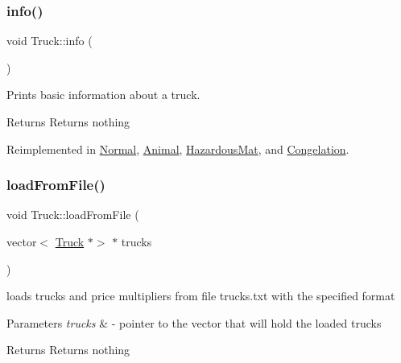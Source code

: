 \mbox{\label{class_truck_a38f09eab2822524e355ecf6d0a13f7de}} 
\subsubsection{\texorpdfstring{info()}{info()}}
{\footnotesize\ttfamily void Truck\+::info (\begin{DoxyParamCaption}{ }\end{DoxyParamCaption})\hspace{0.3cm}{\ttfamily [virtual]}}



Prints basic information about a truck. 

\begin{DoxyReturn}{Returns}
Returns nothing 
\end{DoxyReturn}


Reimplemented in \hyperlink{class_normal_ade6add2ee09e701113534c97e2a03307}{Normal}, \hyperlink{class_animal_a1e99083943239209f4fbe79380ea5991}{Animal}, \hyperlink{class_hazardous_mat_ab07463da3e9a5d3b8933d2b01332ed00}{Hazardous\+Mat}, and \hyperlink{class_congelation_ac2f7cb9aeeeb9428a9a973e6a2c63942}{Congelation}.

\mbox{\label{class_truck_ae2d129e4cdd6760feee9a81421d40e17}} 
\subsubsection{\texorpdfstring{load\+From\+File()}{loadFromFile()}}
{\footnotesize\ttfamily void Truck\+::load\+From\+File (\begin{DoxyParamCaption}\item[{vector$<$ \hyperlink{class_truck}{Truck} $\ast$$>$ $\ast$}]{trucks }\end{DoxyParamCaption})\hspace{0.3cm}{\ttfamily [static]}}



loads trucks and price multipliers from file trucks.\+txt with the specified format 


\begin{DoxyParams}{Parameters}
{\em trucks} & -\/ pointer to the vector that will hold the loaded trucks \\
\hline
\end{DoxyParams}
\begin{DoxyReturn}{Returns}
Returns nothing 
\end{DoxyReturn}
\mbox{\label{class_truck_a0abc7397fd6dba0eeeb2b5ae3e225fd1}} 
